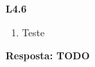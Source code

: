 
\noindent \textbf{L4.6}
\begin{enumerate}[label={\textbf{\alph*.}}]
\item Teste
\end{enumerate}
\textbf{Resposta: TODO}